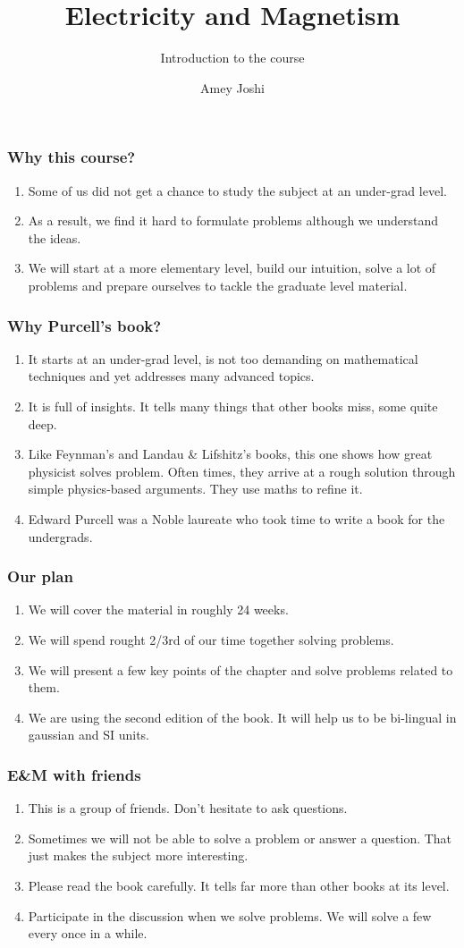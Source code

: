 \documentclass{beamer}
\title{Electricity and Magnetism}
\subtitle{Introduction to the course}
\author{Amey Joshi}
\begin{document}
\frame{\titlepage}

\begin{frame}
\frametitle{Why this course?}
\begin{enumerate}
\item Some of us did not get a chance to study the subject at an under-grad level.
\item As a result, we find it hard to formulate problems although we understand the
ideas.
\item We will start at a more elementary level, build our intuition, solve a lot
of problems and prepare ourselves to tackle the graduate level material. 
\end{enumerate}
\end{frame}

\begin{frame}
\frametitle{Why Purcell's book?}
\begin{enumerate}
\item It starts at an under-grad level, is not too demanding on mathematical techniques
and yet addresses many advanced topics.
\item It is full of insights. It tells many things that other books miss, some quite
deep.
\item Like Feynman's and Landau \& Lifshitz's books, this one shows how great physicist
solves problem. Often times, they arrive at a rough solution through simple physics-based
arguments. They use maths to refine it.
\item Edward Purcell was a Noble laureate who took time to write a book for the
undergrads.
\end{enumerate}
\end{frame}

\begin{frame}
\frametitle{Our plan}
\begin{enumerate}
\item We will cover the material in roughly 24 weeks.
\item We will spend rought 2/3rd of our time together solving problems.
\item We will present a few key points of the chapter and solve problems related
to them.
\item We are using the second edition of the book. It will help us to be bi-lingual
in gaussian and SI units.
\end{enumerate}
\end{frame}

\begin{frame}
\frametitle{E\&M with friends}
\begin{enumerate}
\item This is a group of friends. Don't hesitate to ask questions.
\item Sometimes we will not be able to solve a problem or answer a question. That
just makes the subject more interesting.
\item Please read the book carefully. It tells far more than other books at its
level.
\item Participate in the discussion when we solve problems. We will solve a few
every once in a while.
\end{enumerate}
\end{frame}
\end{document}
